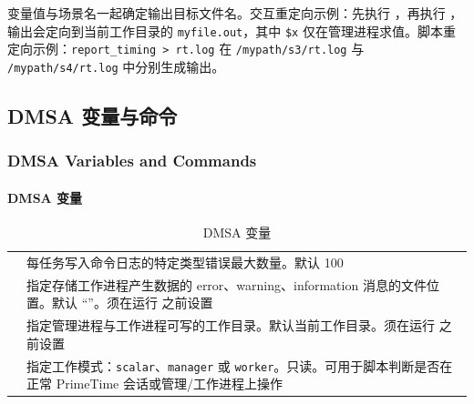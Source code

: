  变量值与场景名一起确定输出目标文件名。交互重定向示例：先执行 ，再执行 ，输出会定向到当前工作目录的 \texttt{myfile.out}，其中 \texttt{\$x} 仅在管理进程求值。脚本重定向示例：\texttt{report\_timing > rt.log} 在 \texttt{/mypath/s3/rt.log} 与 \texttt{/mypath/s4/rt.log} 中分别生成输出。

\subsection{DMSA 变量与命令}
\subsubsection*{DMSA Variables and Commands}

\paragraph{DMSA 变量}
\begin{table}[htbp]
\centering
\caption{DMSA 变量}
\small
\begin{tabular}{|L{5.5cm}|L{7.5cm}|}
\hline
{} &  \\
\hline
{} & 每任务写入命令日志的特定类型错误最大数量。默认 100 \\
 & 指定存储工作进程产生数据的 error、warning、information 消息的文件位置。默认 ``''。须在运行  之前设置 \\
 & 指定管理进程与工作进程可写的工作目录。默认当前工作目录。须在运行  之前设置 \\
 & 指定工作模式：\texttt{scalar}、\texttt{manager} 或 \texttt{worker}。只读。可用于脚本判断是否在正常 PrimeTime 会话或管理/工作进程上操作 \\
\hline
\end{tabular}
\end{table}

